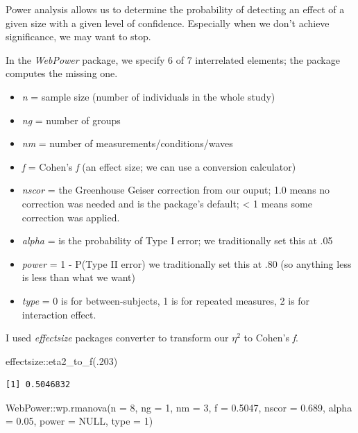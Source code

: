 \documentclass[
  11pt,
]{book}
\newenvironment{Shaded}{\begin{snugshade}}{\end{snugshade}}
\newcommand{\AttributeTok}[1]{\textcolor[rgb]{0.77,0.63,0.00}{#1}}
\newcommand{\ConstantTok}[1]{\textcolor[rgb]{0.00,0.00,0.00}{#1}}
\newcommand{\DecValTok}[1]{\textcolor[rgb]{0.00,0.00,0.81}{#1}}
\newcommand{\FloatTok}[1]{\textcolor[rgb]{0.00,0.00,0.81}{#1}}
\newcommand{\FunctionTok}[1]{\textcolor[rgb]{0.00,0.00,0.00}{#1}}
\newcommand{\NormalTok}[1]{#1}
\newcommand{\SpecialCharTok}[1]{\textcolor[rgb]{0.00,0.00,0.00}{#1}}
\providecommand{\tightlist}{%
  \setlength{\itemsep}{0pt}\setlength{\parskip}{0pt}}
\begin{document}
Power analysis allows us to determine the probability of detecting an effect of a given size with a given level of confidence. Especially when we don't achieve significance, we may want to stop.

In the \emph{WebPower} package, we specify 6 of 7 interrelated elements; the package computes the missing one.

\begin{itemize}
\tightlist
\item
  \emph{n} = sample size (number of individuals in the whole study)
\item
  \emph{ng} = number of groups
\item
  \emph{nm} = number of measurements/conditions/waves
\item
  \emph{f} = Cohen's \emph{f} (an effect size; we can use a conversion calculator)
\item
  \emph{nscor} = the Greenhouse Geiser correction from our ouput; 1.0 means no correction was needed and is the package's default; \textless{} 1 means some correction was applied.
\item
  \emph{alpha} = is the probability of Type I error; we traditionally set this at .05
\item
  \emph{power} = 1 - P(Type II error) we traditionally set this at .80 (so anything less is less than what we want)
\item
  \emph{type} = 0 is for between-subjects, 1 is for repeated measures, 2 is for interaction effect.
\end{itemize}

I used \emph{effectsize} packages converter to transform our \(\eta^2\) to Cohen's \emph{f}.

\begin{Shaded}
\begin{Highlighting}[]
\NormalTok{effectsize}\SpecialCharTok{::}\FunctionTok{eta2\_to\_f}\NormalTok{(.}\DecValTok{203}\NormalTok{) }
\end{Highlighting}
\end{Shaded}

\begin{verbatim}
[1] 0.5046832
\end{verbatim}

\begin{Shaded}
\begin{Highlighting}[]
\NormalTok{WebPower}\SpecialCharTok{::}\FunctionTok{wp.rmanova}\NormalTok{(}\AttributeTok{n =} \DecValTok{8}\NormalTok{, }\AttributeTok{ng =} \DecValTok{1}\NormalTok{, }\AttributeTok{nm =} \DecValTok{3}\NormalTok{, }\AttributeTok{f =} \FloatTok{0.5047}\NormalTok{, }\AttributeTok{nscor =} \FloatTok{0.689}\NormalTok{,}
    \AttributeTok{alpha =} \FloatTok{0.05}\NormalTok{, }\AttributeTok{power =} \ConstantTok{NULL}\NormalTok{, }\AttributeTok{type =} \DecValTok{1}\NormalTok{)}
\end{Highlighting}
\end{Shaded}
\end{document}
